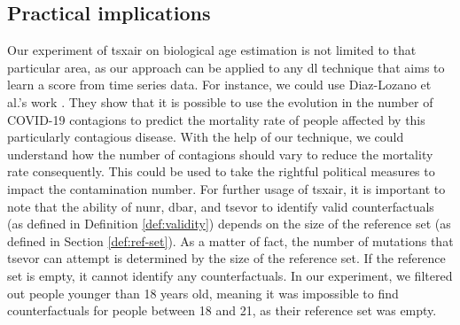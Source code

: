 \subsection{Practical implications}
\label{sec:discussion:practical}
Our experiment of \gls{tsxair} on biological age estimation is not limited to that particular area, as our approach can be applied to any \gls{dl} technique that aims to learn a score from time series data. For instance, we could use Diaz-Lozano et al.'s work \cite{diaz-lozano_covid-19_2022}. They show that it is possible to use the evolution in the number of COVID-19 contagions to predict the mortality rate of people affected by this particularly contagious disease. With the help of our technique, we could understand how the number of contagions should vary to reduce the mortality rate consequently. This could be used to take the rightful political measures to impact the contamination number. 
For further usage of \gls{tsxair}, it is important to note that the ability of \gls{nunr}, \gls{dbar}, and \gls{tsevor} to identify valid counterfactuals (as defined in Definition \ref{def:validity}) depends on the size of the reference set (as defined in Section \ref{def:ref-set}). As a matter of fact, the number of mutations that \gls{tsevor} can attempt is determined by the size of the reference set. If the reference set is empty, it cannot identify any counterfactuals. In our experiment, we filtered out people younger than 18 years old, meaning it was impossible to find counterfactuals for people between 18 and 21, as their reference set was empty.

